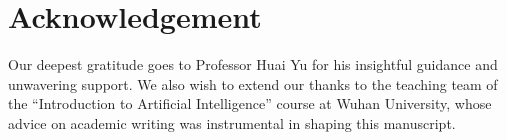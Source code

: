 
\section{Acknowledgement}

Our deepest gratitude goes to Professor Huai Yu for his insightful guidance and unwavering support. We also wish to extend our thanks to the teaching team of the ``Introduction to Artificial Intelligence'' course at Wuhan University, whose advice on academic writing was instrumental in shaping this manuscript.